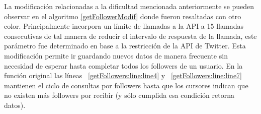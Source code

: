 La modificación relacionadas a la dificultad mencionada anteriormente se pueden observar en el algoritmo \ref{getFollowerModif} donde fueron resaltadas con otro color. Principalmente incorpora un límite de llamadas a la API a 15 llamadas consecutivas de tal manera de reducir el intervalo de respuesta de la llamada, este parámetro fue determinado en base a la restricción de la API de Twitter. Esta modificación permite ir guardando nuevos datos de manera frecuente sin necesidad de esperar hasta completar todos los followers de un usuario. En  la función original las líneas ~\ref{getFollowers:line:line4} y ~\ref{getFollowers:line:line7} mantienen el ciclo de consultas por followers hasta que los cursores indican que no existen más followers por recibir (y sólo cumplida esa condición retorna datos).